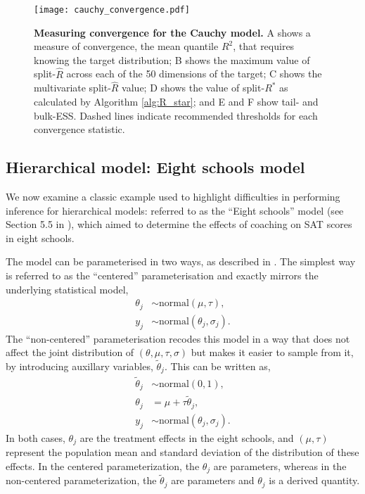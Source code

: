 \documentclass{article}
\begin{document}
\begin{figure}[!htb]
	\centerline{\texttt{[image: cauchy\_convergence.pdf]}}
	\caption{\textbf{Measuring convergence for the Cauchy model.} A shows a measure of convergence, the mean quantile $R^2$, that requires knowing the target distribution; B shows the maximum value of split-$\widehat{R}$ across each of the 50 dimensions of the target; C shows the multivariate split-$\widehat{R}$ value; D shows the value of split-$R^*$ as calculated by Algorithm \ref{alg:R_star}; and E and F show tail- and bulk-ESS. Dashed lines indicate recommended thresholds for each convergence statistic.}
	\label{fig:cauchy_convergence}
\end{figure}

\subsection{Hierarchical model: Eight schools model}\label{sec:eight_shools}
We now examine a classic example used to highlight difficulties in performing inference for hierarchical models: referred to as the ``Eight schools'' model (see Section 5.5 in \cite{gelman2013bayesian}), which aimed to determine the effects of coaching on SAT scores in eight schools. 

The model can be parameterised in two ways, as described in \cite{vehtari2019rank}. The simplest way is referred to as the ``centered'' parameterisation and exactly mirrors the underlying statistical model,
%
\begin{align*}
\theta_j &\sim \text{normal}(\mu, \tau), \\
y_j &\sim \text{normal}(\theta_j, \sigma_j).
\end{align*}
%
The ``non-centered'' parameterisation recodes this model in a way that does not affect the joint distribution of $(\theta, \mu, \tau, \sigma)$ but makes it easier to sample from it, by introducing auxillary variables, $\tilde \theta_j$. This can be written as,
%
\begin{align*}
\tilde{\theta}_j &\sim \text{normal}(0, 1), \\
\theta_j &= \mu + \tau \tilde{\theta}_j,\\
y_j &\sim \text{normal}(\theta_j, \sigma_j).
\end{align*}
%
In both cases, $\theta_j$ are the treatment effects in the eight schools, and $(\mu, \tau)$ represent the population mean and standard deviation 
of the distribution of these effects. In the centered parameterization, the $\theta_j$ are parameters, whereas in the non-centered parameterization, the $\tilde{\theta}_j$ are parameters and $\theta_j$ is a derived quantity.
\end{document}
